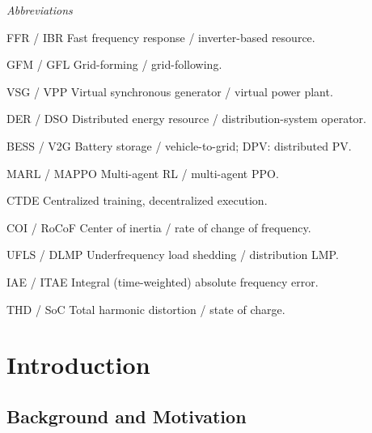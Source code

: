 \documentclass[lettersize,journal]{IEEEtran}
\begin{document}
\begin{IEEEdescription}
\item[\emph{Abbreviations}]\hfill
\item[FFR / IBR] Fast frequency response / inverter-based resource.
\item[GFM / GFL] Grid-forming / grid-following.
\item[VSG / VPP] Virtual synchronous generator / virtual power plant.
\item[DER / DSO] Distributed energy resource / distribution-system operator.
\item[BESS / V2G] Battery storage / vehicle-to-grid; DPV: distributed PV.
\item[MARL / MAPPO] Multi-agent RL / multi-agent PPO.
\item[CTDE] Centralized training, decentralized execution.
\item[COI / RoCoF] Center of inertia / rate of change of frequency.
\item[UFLS / DLMP] Underfrequency load shedding / distribution LMP.
\item[IAE / ITAE] Integral (time-weighted) absolute frequency error.
\item[THD / SoC] Total harmonic distortion / state of charge.

\end{IEEEdescription}

\section{Introduction}
\label{sec:intro}

\subsection{Background and Motivation}
\label{ssec:background}
\end{document}
